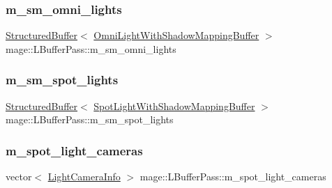 \hypertarget{structmage_1_1_l_buffer_pass_aa5fa46c76d4d7d58141eeb021bb9f20c}{}\label{structmage_1_1_l_buffer_pass_aa5fa46c76d4d7d58141eeb021bb9f20c} 
\subsubsection{\texorpdfstring{m\+\_\+sm\+\_\+omni\+\_\+lights}{m\_sm\_omni\_lights}}
{\footnotesize\ttfamily \hyperlink{structmage_1_1_structured_buffer}{Structured\+Buffer}$<$ \hyperlink{structmage_1_1_omni_light_with_shadow_mapping_buffer}{Omni\+Light\+With\+Shadow\+Mapping\+Buffer} $>$ mage\+::\+L\+Buffer\+Pass\+::m\+\_\+sm\+\_\+omni\+\_\+lights\hspace{0.3cm}{\ttfamily [private]}}

\hypertarget{structmage_1_1_l_buffer_pass_a5630c1edc1d0833d08e0350bef5ec8a5}{}\label{structmage_1_1_l_buffer_pass_a5630c1edc1d0833d08e0350bef5ec8a5} 
\subsubsection{\texorpdfstring{m\+\_\+sm\+\_\+spot\+\_\+lights}{m\_sm\_spot\_lights}}
{\footnotesize\ttfamily \hyperlink{structmage_1_1_structured_buffer}{Structured\+Buffer}$<$ \hyperlink{structmage_1_1_spot_light_with_shadow_mapping_buffer}{Spot\+Light\+With\+Shadow\+Mapping\+Buffer} $>$ mage\+::\+L\+Buffer\+Pass\+::m\+\_\+sm\+\_\+spot\+\_\+lights\hspace{0.3cm}{\ttfamily [private]}}

\hypertarget{structmage_1_1_l_buffer_pass_ae5332132d7ff616d42448c33837ba814}{}\label{structmage_1_1_l_buffer_pass_ae5332132d7ff616d42448c33837ba814} 
\subsubsection{\texorpdfstring{m\+\_\+spot\+\_\+light\+\_\+cameras}{m\_spot\_light\_cameras}}
{\footnotesize\ttfamily vector$<$ \hyperlink{structmage_1_1_light_camera_info}{Light\+Camera\+Info} $>$ mage\+::\+L\+Buffer\+Pass\+::m\+\_\+spot\+\_\+light\+\_\+cameras\hspace{0.3cm}{\ttfamily [private]}}

